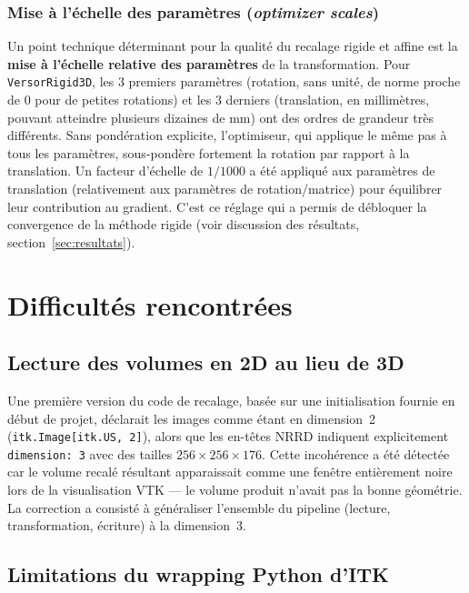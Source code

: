 \documentclass[11pt,a4paper]{article}
\begin{document}
\subsubsection*{Mise à l'échelle des paramètres (\emph{optimizer scales})}

Un point technique déterminant pour la qualité du recalage rigide et affine
est la \textbf{mise à l'échelle relative des paramètres} de la transformation.
Pour \texttt{VersorRigid3D}, les 3 premiers paramètres (rotation, sans unité,
de norme proche de 0 pour de petites rotations) et les 3 derniers (translation,
en millimètres, pouvant atteindre plusieurs dizaines de mm) ont des ordres de
grandeur très différents. Sans pondération explicite, l'optimiseur, qui
applique le même pas à tous les paramètres, sous-pondère fortement la
rotation par rapport à la translation. Un facteur d'échelle de $1/1000$ a été
appliqué aux paramètres de translation (relativement aux paramètres de
rotation/matrice) pour équilibrer leur contribution au gradient. C'est ce
réglage qui a permis de débloquer la convergence de la méthode rigide (voir
discussion des résultats, section~\ref{sec:resultats}).

\section{Difficultés rencontrées}
\label{sec:difficultes}

\subsection{Lecture des volumes en 2D au lieu de 3D}

Une première version du code de recalage, basée sur une initialisation
fournie en début de projet, déclarait les images comme étant en dimension~2
(\texttt{itk.Image[itk.US, 2]}), alors que les en-têtes NRRD indiquent
explicitement \texttt{dimension: 3} avec des tailles $256 \times 256 \times
176$. Cette incohérence a été détectée car le volume recalé résultant
apparaissait comme une fenêtre entièrement noire lors de la visualisation VTK
— le volume produit n'avait pas la bonne géométrie. La correction a consisté
à généraliser l'ensemble du pipeline (lecture, transformation, écriture) à la
dimension~3.

\subsection{Limitations du wrapping Python d'ITK}
\end{document}
